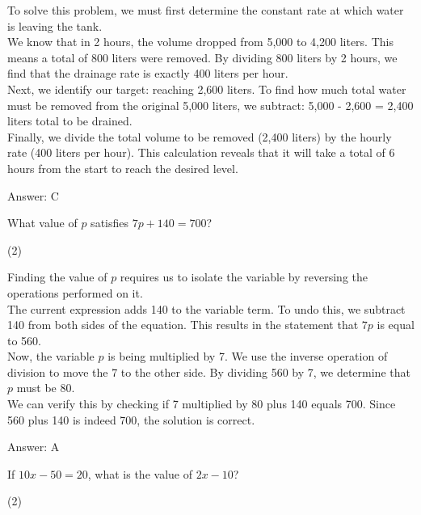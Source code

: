 \documentclass[11pt,paper=a4,answers]{exam}
\begin{document}
\begin{questions}
\begin{solution}
To solve this problem, we must first determine the constant rate at which water is leaving the tank. 
\\[10pt]
We know that in 2 hours, the volume dropped from 5,000 to 4,200 liters. This means a total of 800 liters were removed. By dividing 800 liters by 2 hours, we find that the drainage rate is exactly 400 liters per hour. 
\\[10pt]
Next, we identify our target: reaching 2,600 liters. To find how much total water must be removed from the original 5,000 liters, we subtract: 5,000 - 2,600 = 2,400 liters total to be drained. 
\\[10pt]
Finally, we divide the total volume to be removed (2,400 liters) by the hourly rate (400 liters per hour). This calculation reveals that it will take a total of 6 hours from the start to reach the desired level.

\vspace{15pt}
Answer: \colorbox{yellow!100}{C}
\end{solution}

\question
What value of $p$ satisfies $7p + 140 = 700$?
\begin{tasks}(2)
\end{tasks}

\begin{solution}
Finding the value of $p$ requires us to isolate the variable by reversing the operations performed on it. 
\\[10pt]
The current expression adds 140 to the variable term. To undo this, we subtract 140 from both sides of the equation. This results in the statement that $7p$ is equal to 560. 
\\[10pt]
Now, the variable $p$ is being multiplied by 7. We use the inverse operation of division to move the 7 to the other side. By dividing 560 by 7, we determine that $p$ must be 80. 
\\[10pt]
We can verify this by checking if 7 multiplied by 80 plus 140 equals 700. Since 560 plus 140 is indeed 700, the solution is correct.

\vspace{15pt}
Answer: \colorbox{yellow!100}{A}
\end{solution}

\question
If $10x - 50 = 20$, what is the value of $2x - 10$?
\begin{tasks}(2)
\end{tasks}


\end{questions}
\end{document}
